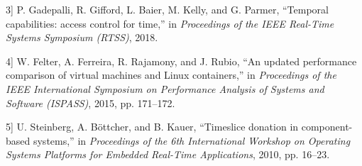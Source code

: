 \protect{}\label{cite:4-3}

\noindent {[}3{]} P. Gadepalli, R. Gifford, L. Baier, M. Kelly, and G. Parmer, ``Temporal capabilities: access control for time,'' in \textit{Proceedings of the IEEE Real-Time Systems Symposium (RTSS)}, 2018.

\protect{}\label{cite:4-4}

\noindent {[}4{]} W. Felter, A. Ferreira, R. Rajamony, and J. Rubio, ``An updated performance comparison of virtual machines and Linux containers,'' in \textit{Proceedings of the IEEE International Symposium on Performance Analysis of Systems and Software (ISPASS)}, 2015, pp. 171--172.

\protect{}\label{cite:4-5}

\noindent {[}5{]} U. Steinberg, A. B{\"o}ttcher, and B. Kauer, ``Timeslice donation in component-based systems,'' in \textit{Proceedings of the 6th International Workshop on Operating Systems Platforms for Embedded Real-Time Applications}, 2010, pp. 16--23.

